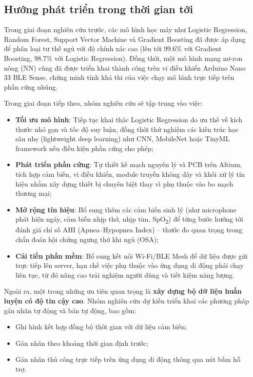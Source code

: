 \subsection*{Hướng phát triển trong thời gian tới}

Trong giai đoạn nghiên cứu trước, các mô hình học máy như Logistic Regression, Random Forest, Support Vector Machine và Gradient Boosting đã được áp dụng để phân loại tư thế ngủ với độ chính xác cao (lên tới 99.6\% với Gradient Boosting, 98.7\% với Logistic Regression). Đồng thời, một mô hình mạng nơ-ron nông (NN) cũng đã được triển khai thành công trên vi điều khiển Arduino Nano 33 BLE Sense, chứng minh tính khả thi của việc chạy mô hình trực tiếp trên phần cứng nhúng.

Trong giai đoạn tiếp theo, nhóm nghiên cứu sẽ tập trung vào việc:
\begin{itemize}
    \item \textbf{Tối ưu mô hình}: Tiếp tục khai thác Logistic Regression do ưu thế về kích thước nhỏ gọn và tốc độ suy luận, đồng thời thử nghiệm các kiến trúc học sâu nhẹ (lightweight deep learning) như CNN, MobileNet hoặc TinyML framework nếu điều kiện phần cứng cho phép;
    \item \textbf{Phát triển phần cứng}: Tự thiết kế mạch nguyên lý và PCB trên Altium, tích hợp cảm biến, vi điều khiển, module truyền không dây và khối xử lý tín hiệu nhằm xây dựng thiết bị chuyên biệt thay vì phụ thuộc vào bo mạch thương mại;
    \item \textbf{Mở rộng tín hiệu}: Bổ sung thêm các cảm biến sinh lý (như microphone phát hiện ngáy, cảm biến nhịp thở, nhịp tim, SpO\textsubscript{2}) để từng bước hướng tới đánh giá chỉ số AHI (Apnea–Hypopnea Index) – thước đo quan trọng trong chẩn đoán hội chứng ngưng thở khi ngủ (OSA);
    \item \textbf{Cải tiến phần mềm}: Bổ sung kết nối Wi-Fi/BLE Mesh để dữ liệu được gửi trực tiếp lên server, hạn chế việc phụ thuộc vào ứng dụng di động phải chạy liên tục, từ đó nâng cao trải nghiệm người dùng và tiết kiệm năng lượng.
\end{itemize}

Ngoài ra, một trong những ưu tiên quan trọng là \textbf{xây dựng bộ dữ liệu huấn luyện có độ tin cậy cao}. Nhóm nghiên cứu dự kiến triển khai các phương pháp gán nhãn tự động và bán tự động, bao gồm:
\begin{itemize}
    \item Ghi hình kết hợp đồng bộ thời gian với dữ liệu cảm biến;
    \item Gán nhãn theo khoảng thời gian định trước;
    \item Gán nhãn thủ công trực tiếp trên ứng dụng di động thông qua nút bấm hỗ trợ.
\end{itemize}


